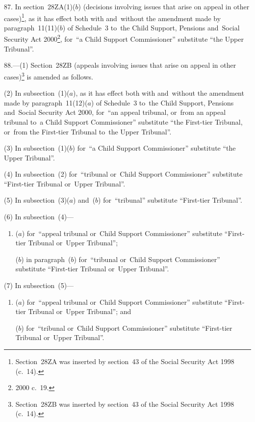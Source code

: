 \documentclass[12pt,a4paper]{article}
\begin{document}
\medskip

87.  In section~28ZA(1)($b$)  (decisions involving issues that arise on appeal in other cases)\footnote{Section~28ZA was inserted by section~43 of the Social Security Act 1998 (c.~14).}, as it has effect both with and~without the amendment made by paragraph~11(11)($b$)  of Schedule~3 to~the Child Support, Pensions and~Social Security Act 2000\footnote{2000 c.~19.}, for~“a Child Support Commissioner” substitute “the Upper Tribunal”.

\medskip

88.---(1)  Section~28ZB (appeals involving issues that arise on appeal in other cases)\footnote{Section~28ZB was inserted by section~43 of the Social Security Act 1998 (c.~14).} is amended as follows.

(2) In subsection~(1)($a$), as it has effect both with and~without the amendment made by paragraph~11(12)($a$)  of Schedule~3 to~the Child Support, Pensions and~Social Security Act 2000, for~“an appeal tribunal, or~from an appeal tribunal to~a Child Support Commissioner” substitute “the First-tier Tribunal, or~from the First-tier Tribunal to~the Upper Tribunal”.

(3) In subsection~(1)($b$)  for~“a Child Support Commissioner” substitute “the Upper Tribunal”.

(4) In subsection~(2) for~“tribunal or~Child Support Commissioner” substitute “First-tier Tribunal or~Upper Tribunal”.

(5) In subsection~(3)($a$)  and~($b$)  for~“tribunal” substitute “First-tier Tribunal”.

(6) In subsection~(4)—
\begin{enumerate}\item[]
($a$) for~“appeal tribunal or~Child Support Commissioner” substitute “First-tier Tribunal or~Upper Tribunal”;

($b$) in paragraph~($b$)  for~“tribunal or~Child Support Commissioner” substitute “First-tier Tribunal or~Upper Tribunal”.
\end{enumerate}

(7) In subsection~(5)—
\begin{enumerate}\item[]
($a$) for~“appeal tribunal or~Child Support Commissioner” substitute “First-tier Tribunal or~Upper Tribunal”; and

($b$) for~“tribunal or~Child Support Commissioner” substitute “First-tier Tribunal or~Upper Tribunal”.
\end{enumerate}
\end{document}
